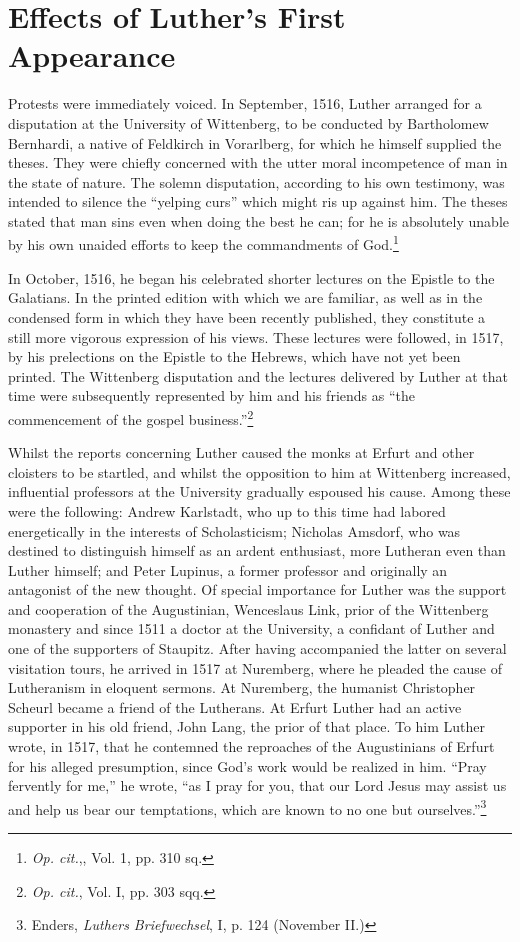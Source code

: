 \section{Effects of Luther’s First Appearance}

Protests were immediately voiced. In September, 1516, Luther
arranged for a disputation at the University of Wittenberg, to be
conducted by Bartholomew Bernhardi, a native of Feldkirch in
Vorarlberg, for which he himself supplied the theses. They were
chiefly concerned with the utter moral incompetence of man in the
state of nature. The solemn disputation, according to his own testimony,
was intended to silence the “yelping curs” which might ris up against him.
The theses stated that man sins even when doing the best he can;
for he is absolutely unable by his own unaided efforts to keep the commandments of God.\footnote
{\textit{Op. cit.},, Vol. 1, pp. 310 sq.}

In October, 1516, he began his celebrated shorter lectures on the
Epistle to the Galatians. In the printed edition with which we are
familiar, as well as in the condensed form in which they have been
recently published, they constitute a still more vigorous expression of
his views. These lectures were followed, in 1517, by his prelections on
the Epistle to the Hebrews, which have not yet been printed. The
Wittenberg disputation and the lectures delivered by Luther at that
time were subsequently represented by him and his friends as “the
commencement of the gospel business.”\footnote{\textit{Op. cit.}, Vol. I, pp. 303 sqq.}

Whilst the reports concerning Luther caused the monks at Erfurt
and other cloisters to be startled, and whilst the opposition to him
at Wittenberg increased, influential professors at the University
gradually espoused his cause. Among these were the following:
Andrew Karlstadt, who up to this time had labored energetically in
the interests of Scholasticism; Nicholas Amsdorf, who was destined
to distinguish himself as an ardent enthusiast, more Lutheran even
than Luther himself; and Peter Lupinus, a former professor and
originally an antagonist of the new thought. Of special importance
for Luther was the support and cooperation of the Augustinian,
Wenceslaus Link, prior of the Wittenberg monastery and since 1511
a doctor at the University, a confidant of Luther and one of the
supporters of Staupitz. After having accompanied the latter on several
visitation tours, he arrived in 1517 at Nuremberg, where he pleaded
the cause of Lutheranism in eloquent sermons. At Nuremberg, the
humanist Christopher Scheurl became a friend of the Lutherans.
At Erfurt Luther had an active supporter in his old friend, John
Lang, the prior of that place. To him Luther wrote, in 1517, that he
contemned the reproaches of the Augustinians of Erfurt for his alleged
presumption, since God’s work would be realized in him. “Pray
fervently for me,” he wrote, “as I pray for you, that our Lord Jesus
may assist us and help us bear our temptations, which are known
to no one but ourselves.”\footnote{Enders, \textit{Luthers Briefwechsel}, I, p. 124 (November II.)}

